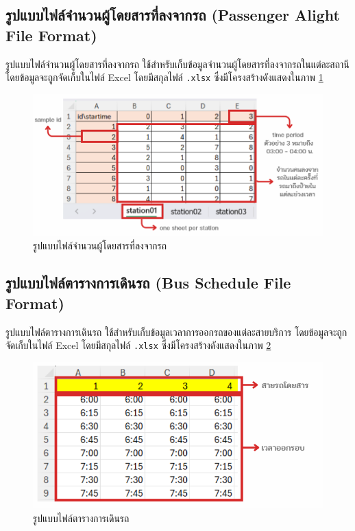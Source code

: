   \newpage
  \subsection{รูปแบบไฟล์จำนวนผู้โดยสารที่ลงจากรถ (Passenger Alight File Format)}
  \begin{mypara}
      \indent รูปแบบไฟล์จำนวนผู้โดยสารที่ลงจากรถ ใช้สำหรับเก็บข้อมูลจำนวนผู้โดยสารที่ลงจากรถในแต่ละสถานี
      โดยข้อมูลจะถูกจัดเก็บในไฟล์ Excel โดยมีสกุลไฟล์ \texttt{.xlsx} 
      ซึ่งมีโครงสร้างดังแสดงในภาพ \ref{fig:PassengerAlightFileFormat}
      \begin{figure}[H]
        \centering
        \includegraphics[scale=0.5]{Passenger_alighting.png}
        \caption{รูปแบบไฟล์จำนวนผู้โดยสารที่ลงจากรถ}
        \label{fig:PassengerAlightFileFormat}
      \end{figure}
  \end{mypara}

  \subsection{รูปแบบไฟล์ตารางการเดินรถ (Bus Schedule File Format)}
  \begin{mypara}
      \indent รูปแบบไฟล์ตารางการเดินรถ ใช้สำหรับเก็บข้อมูลเวลาการออกรถของแต่ละสายบริการ 
      โดยข้อมูลจะถูกจัดเก็บในไฟล์ Excel โดยมีสกุลไฟล์ \texttt{.xlsx} 
      ซึ่งมีโครงสร้างดังแสดงในภาพ \ref{fig:BusScheduleFileFormat}
      \begin{figure}[H]
        \centering
        \includegraphics[scale=0.5]{bus_schedule.png}
        \caption{รูปแบบไฟล์ตารางการเดินรถ}
        \label{fig:BusScheduleFileFormat}
      \end{figure}
  \end{mypara}